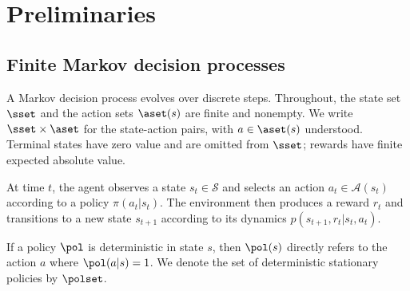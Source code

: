 
\section{Preliminaries}
\label{sec: mcopi}




\subsection{Finite Markov decision processes}






























A Markov decision process evolves over discrete steps.
Throughout, the state set $\sset$ and the action sets $\aset(s)$ are finite and nonempty. We write $\sset\times\aset$ for the state-action pairs, with $a\in\aset(s)$ understood. Terminal states have zero value and are omitted from $\sset$; rewards have finite expected absolute value.

At time \(t\), the agent observes a state \(s_t \in \mathcal S\) and selects an action \(a_t \in \mathcal A(s_t)\) according to a policy \(\pi(a_t | s_t)\).
The environment then produces a reward \(r_t\) and transitions to a new state \(s_{t+1}\) according to its dynamics $p(s_{t+1}, r_t | s_t, a_t)$.



If a policy $\pol$ is deterministic in state $s$, then $\pol(s)$ directly refers to the action $a$ where $\pol(a | s) = 1$.
We denote the set of deterministic stationary policies by $\polset$.









































